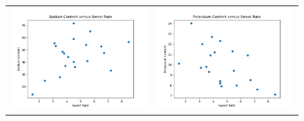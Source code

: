 \begin{enumerate}[label=(\alph*)]
\begin{figure}[H]
\begin{tabular}{cc}
        \end{tabular}
    \end{figure}

    \begin{figure}[H]
        \centering
        \begin{tabular}{cc}
            \includegraphics[scale=0.325]{./python/chapter-5/Exercise-5-4-Sweat-vs-Sodium.png} &
            \includegraphics[scale=0.325]{./python/chapter-5/Exercise-5-4-Sweat-vs-Potassium.png} \\

\end{tabular}
\end{figure}
\end{enumerate}
